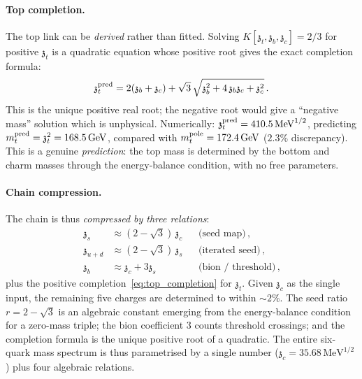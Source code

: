 \documentclass[aps,prd,twocolumn,showpacs,preprintnumbers,superscriptaddress,floatfix]{revtex4-2}
\newcommand{\MeV}{\,\mathrm{MeV}}
\newcommand{\GeV}{\,\mathrm{GeV}}
\newcommand{\zch}{\mathfrak{z}}
\begin{document}
\paragraph{Top completion.}
The top link can be \emph{derived} rather than fitted.
Solving $K[\zch_t, \zch_b, \zch_c] = 2/3$ for positive $\zch_t$
is a quadratic equation whose positive root gives the exact
completion formula:
\begin{equation}
  \zch_t^{\rm pred} = 2(\zch_b + \zch_c)
  + \sqrt{3}\,\sqrt{\zch_b^2 + 4\,\zch_b\zch_c + \zch_c^2}\,.
  \label{eq:top_completion}
\end{equation}
This is the unique positive real root; the negative root would
give a ``negative mass'' solution which is unphysical.
Numerically: $\zch_t^{\rm pred} = 410.5\MeV^{1/2}$, predicting
$m_t^{\rm pred} = \zch_t^2 = 168.5\GeV$, compared with
$m_t^{\rm pole} = 172.4\GeV$ ($2.3\%$ discrepancy).
This is a genuine \emph{prediction}: the top mass is determined
by the bottom and charm masses through the energy-balance
condition, with no free parameters.

\paragraph{Chain compression.}
The chain is thus \emph{compressed by three relations}:
\begin{align}
  \zch_s &\approx (2-\sqrt{3})\,\zch_c
    &&\text{(seed map)}\,,\nonumber\\
  \zch_{u+d} &\approx (2-\sqrt{3})\,\zch_s
    &&\text{(iterated seed)}\,,\nonumber\\
  \zch_b &\approx \zch_c + 3\zch_s
    &&\text{(bion / threshold)}\,,
  \label{eq:chain_compression}
\end{align}
plus the positive completion~\eqref{eq:top_completion} for
$\zch_t$.
Given $\zch_c$ as the single input, the remaining five charges
are determined to within $\sim\!2\%$.
The seed ratio $r = 2 - \sqrt{3}$ is an algebraic constant
emerging from the energy-balance condition for a zero-mass triple;
the bion coefficient $3$ counts threshold crossings; and the
completion formula is the unique positive root of a quadratic.
The entire six-quark mass spectrum is thus parametrised by a
single number ($\zch_c = 35.68\MeV^{1/2}$) plus four algebraic
relations.
\end{document}
